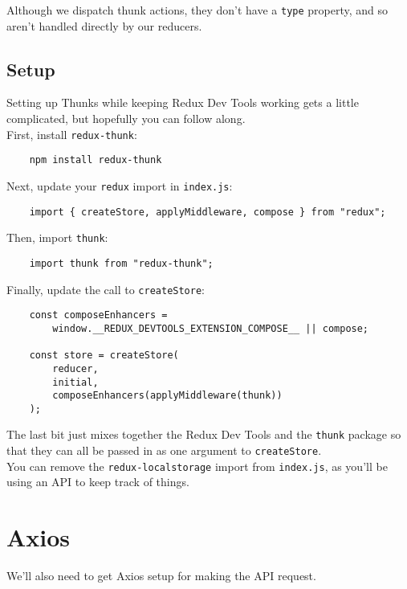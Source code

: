 Although we dispatch thunk actions, they don't have a \texttt{type} property, and so aren't handled directly by our reducers.


\subsection{Setup}

Setting up Thunks while keeping Redux Dev Tools working gets a little complicated, but hopefully you can follow along.
\\

First, install \texttt{redux-thunk}:

\begin{verbatim}
    npm install redux-thunk
\end{verbatim}

Next, update your \texttt{redux} import in \texttt{index.js}:

\begin{verbatim}
    import { createStore, applyMiddleware, compose } from "redux";
\end{verbatim}

Then, import \texttt{thunk}:

\begin{verbatim}
    import thunk from "redux-thunk";
\end{verbatim}

Finally, update the call to \texttt{createStore}:

\begin{verbatim}
    const composeEnhancers =
        window.__REDUX_DEVTOOLS_EXTENSION_COMPOSE__ || compose;

    const store = createStore(
        reducer,
        initial,
        composeEnhancers(applyMiddleware(thunk))
    );
\end{verbatim}

The last bit just mixes together the Redux Dev Tools and the \texttt{thunk} package so that they can all be passed in as one argument to \texttt{createStore}.
\\

You can remove the \texttt{redux-localstorage} import from \texttt{index.js}, as you'll be using an API to keep track of things.


\section{Axios}

We'll also need to get Axios setup for making the API request.
\\

